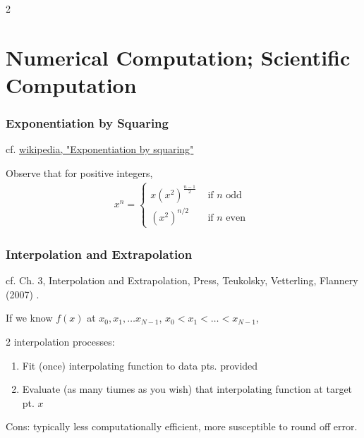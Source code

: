 \documentclass[10pt]{amsart}
\begin{document}
\begin{multicols*}{2}


\part{Numerical Computation; Scientific Computation}

\section{Exponentiation by Squaring}

cf. \href{https://en.wikipedia.org/wiki/Exponentiation_by_squaring}{wikipedia, "Exponentiation by squaring"}

Observe that for positive integers,
\begin{equation}
\begin{gathered}
x^n = \begin{cases} x(x^2)^{\frac{n-1}{2}} & \text{ if $n$ odd } \\
(x^2)^{n/2} & \text{ if $n$ even }
\end{cases}
\end{gathered}
\end{equation}

\section{Interpolation and Extrapolation}

cf. Ch. 3, Interpolation and Extrapolation, Press, Teukolsky, Vetterling, Flannery (2007) \cite{PTVF2007}.

If we know $f(x)$ at $x_0, x_1, \dots x_{N-1}$, $x_0 < x_1 < \dots < x_{N-1}$,

2 interpolation processes:
\begin{enumerate}
	\item Fit (once) interpolating function to data pts. provided
	\item Evaluate (as many tiumes as you wish) that interpolating function at target pt. $x$
\end{enumerate}
Cons: typically less computationally efficient, more susceptible to round off error.


\end{multicols*}
\end{document}
